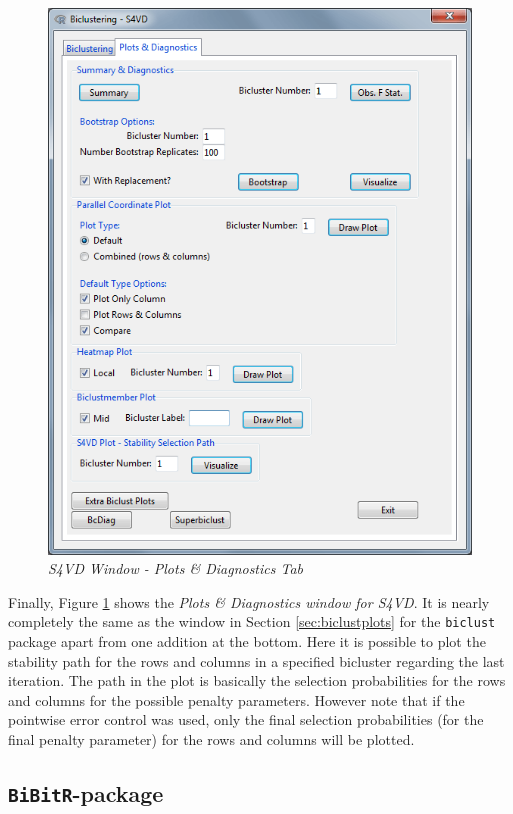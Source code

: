\documentclass[a4paper]{article}\usepackage[]{graphicx}\usepackage[]{color}
\begin{document}
\begin{figure}[H]
\centering
\includegraphics[scale=0.5]{figures/s4vd_plotdiagtab.png}
\caption{{\it S4VD Window - Plots \& Diagnostics Tab}\label{s4vd_plotdiagtab}}
\end{figure}
\noindent Finally, Figure \ref{s4vd_plotdiagtab} shows the {\it Plots \&
Diagnostics window for S4VD}. It is nearly completely the same as the window in
Section \ref{sec:biclustplots} for the \texttt{biclust} package apart from one
addition at the bottom. Here it is possible to plot the stability path for the
rows and columns in a specified bicluster regarding the last iteration. The
path in the plot is basically the selection probabilities for the rows and
columns for the possible penalty parameters. However note that if the pointwise
error control was used, only the final selection probabilities (for the final
penalty parameter) for the rows and columns will be plotted.

\subsection{\texttt{BiBitR}-package}
\end{document}

